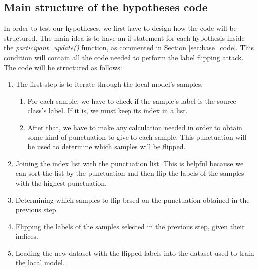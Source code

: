 
\subsection{Main structure of the hypotheses code}
In order to test our hypotheses, we first have to design how the code will be structured. The main idea is to have an if-statement for each hypothesis inside the \textit{participant\_update()} function, as commented in Section \ref{sec:base_code}. This condition will contain all the code needed to perform the label flipping attack. The code will be structured as follows:
\begin{enumerate}
        \item The first step is to iterate through the local model's samples.
                \begin{enumerate}
                        \item For each sample, we have to check if the sample's label is the source class's label. If it is, we must keep its index in a list.
                        \item After that, we have to make any calculation needed in order to obtain some kind of punctuation to give to each sample. This punctuation will be used to determine which samples will be flipped.
                \end{enumerate}
        \item Joining the index list with the punctuation list. This is helpful because we can sort the list by the punctuation and then flip the labels of the samples with the highest punctuation.
        \item Determining which samples to flip based on the punctuation obtained in the previous step.
        \item Flipping the labels of the samples selected in the previous step, given their indices.
        \item Loading the new dataset with the flipped labels into the dataset used to train the local model.
\end{enumerate}

